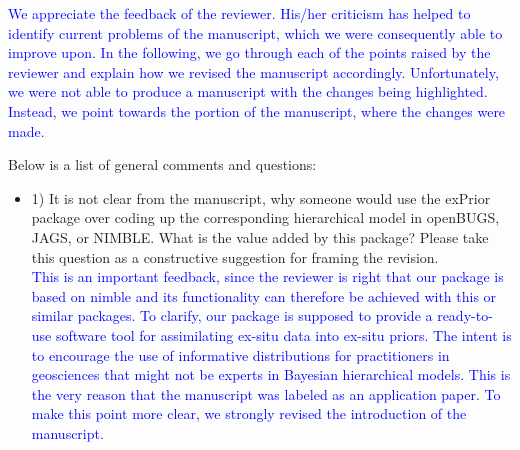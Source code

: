 \documentclass{article}
\begin{document}
\textcolor{blue}{We appreciate the feedback of the reviewer. His/her criticism has helped to identify current problems of the manuscript, which we were consequently able to improve upon. In the following, we go through each of the points raised by the reviewer and explain how we revised the manuscript accordingly. Unfortunately, we were not able to produce a manuscript with the changes being highlighted. Instead, we point towards the portion of the manuscript, where the changes were made.}

Below is a list of general comments and questions:

\begin{itemize}
    \item 1) It is not clear from the manuscript, why someone would use the exPrior package over coding up the corresponding hierarchical model in openBUGS, JAGS, or NIMBLE. What is the value added by this package? Please take this question as a constructive suggestion for framing the revision.\\
    \textcolor{blue}{This is an important feedback, since the reviewer is right that our package is based on nimble and its functionality can therefore be achieved with this or similar packages. To clarify, our package is supposed to provide a ready-to-use software tool for assimilating ex-situ data into ex-situ priors. The intent is to encourage the use of informative distributions for practitioners in geosciences that might not be experts in Bayesian hierarchical models. This is the very reason that the manuscript was labeled as an application paper. To make this point more clear, we strongly revised the introduction of the manuscript.}
    

\end{itemize}
\end{document}

